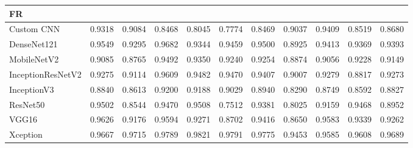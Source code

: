 \documentclass[a4paper,fleqn]{cas-dc}
\begin{document}
\begin{table}[t]
\begin{tabular}{l *{10}{r}}
        \midrule
        \multicolumn{11}{l}{\textbf{FR }} \\
        \midrule
        Custom CNN        & 0.9318 & 0.9084 & 0.8468 & 0.8045 & 0.7774 & 0.8469 & 0.9037 & 0.9409 & 0.8519 & 0.8680 \\
        DenseNet121       & 0.9549 & 0.9295 & 0.9682 & 0.9344 & 0.9459 & 0.9500 & 0.8925 & 0.9413 & 0.9369 & 0.9393 \\
        MobileNetV2       & 0.9085 & 0.8765 & 0.9492 & 0.9350 & 0.9240 & 0.9254 & 0.8874 & 0.9056 & 0.9228 & 0.9149 \\
        InceptionResNetV2 & 0.9275 & 0.9114 & 0.9609 & 0.9482 & 0.9470 & 0.9407 & 0.9007 & 0.9279 & 0.8817 & 0.9273 \\
        InceptionV3       & 0.8840 & 0.8613 & 0.9200 & 0.9188 & 0.9029 & 0.8940 & 0.8290 & 0.8749 & 0.8592 & 0.8827 \\
        ResNet50          & 0.9502 & 0.8544 & 0.9470 & 0.9508 & 0.7512 & 0.9381 & 0.8025 & 0.9159 & 0.9468 & 0.8952 \\
        VGG16             & 0.9626 & 0.9176 & 0.9594 & 0.9271 & 0.8702 & 0.9416 & 0.8650 & 0.9583 & 0.9339 & 0.9262 \\
        Xception          & 0.9667 & 0.9715 & 0.9789 & 0.9821 & 0.9791 & 0.9775 & 0.9453 & 0.9585 & 0.9608 & 0.9689 \\

        \bottomrule
    \end{tabular}
\end{table}
\end{document}
